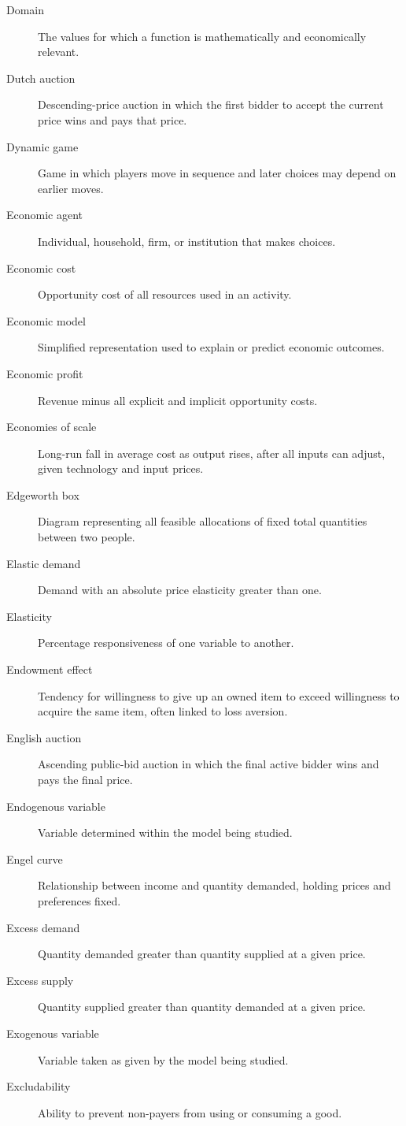 \begin{description}
  \item[Domain] The values for which a function is mathematically and economically relevant.
  \item[Dutch auction] Descending-price auction in which the first bidder to accept the current price wins and pays that price.
  \item[Dynamic game] Game in which players move in sequence and later choices may depend on earlier moves.
  \item[Economic agent] Individual, household, firm, or institution that makes choices.
  \item[Economic cost] Opportunity cost of all resources used in an activity.
  \item[Economic model] Simplified representation used to explain or predict economic outcomes.
  \item[Economic profit] Revenue minus all explicit and implicit opportunity costs.
  \item[Economies of scale] Long-run fall in average cost as output rises,
  after all inputs can adjust, given technology and input prices.
  \item[Edgeworth box] Diagram representing all feasible allocations of fixed total quantities between two people.
  \item[Elastic demand] Demand with an absolute price elasticity greater than one.
  \item[Elasticity] Percentage responsiveness of one variable to another.
  \item[Endowment effect] Tendency for willingness to give up an owned item to exceed willingness to acquire the same item, often linked to loss aversion.
  \item[English auction] Ascending public-bid auction in which the final active bidder wins and pays the final price.
  \item[Endogenous variable] Variable determined within the model being studied.
  \item[Engel curve] Relationship between income and quantity demanded, holding prices and preferences fixed.
  \item[Excess demand] Quantity demanded greater than quantity supplied at a given price.
  \item[Excess supply] Quantity supplied greater than quantity demanded at a given price.
  \item[Exogenous variable] Variable taken as given by the model being studied.
  \item[Excludability] Ability to prevent non-payers from using or consuming a good.

\end{description}
